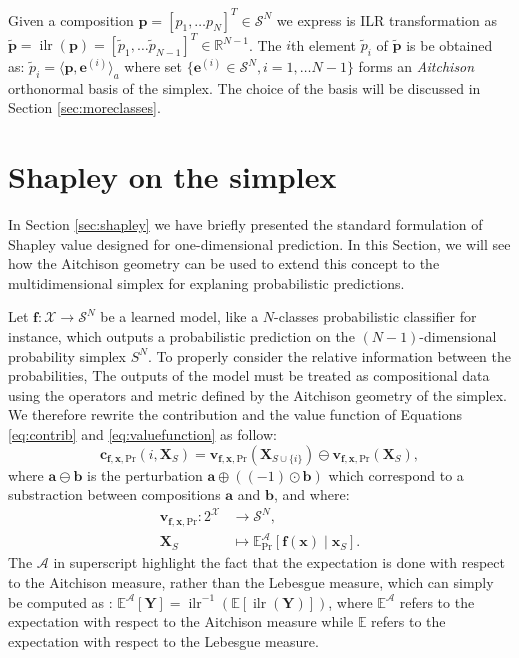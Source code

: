 \documentclass{article}
\theoremstyle{plain}
\theoremstyle{definition}
\theoremstyle{remark}
\DeclareMathOperator{\ilr}{ilr}
\begin{document}
Given a composition $\bm{p} = \left[ p_1,\dots p_N \right]^T \in \mathcal{S}^N$ we express is ILR transformation as $\tilde{\bm{p}} = \ilr \left( \bm{p} \right) = \left[ \tilde{p}_1,\dots \tilde{p}_{N-1} \right]^T \in \mathbb{R}^{N-1}$. The $i$th element $\tilde{p}_i$ of $\tilde{\bm{p}}$ is be obtained as: $\tilde{p}_i = \langle \bm{p}, \bm{e}^{(i)} \rangle_a$ where set $\{\bm{e}^{(i)} \in \mathcal{S}^N, i=1,\dots N-1\}$ forms an \emph{Aitchison} orthonormal basis of the simplex. The choice of the basis will be discussed in Section \ref{sec:moreclasses}.


\section{Shapley on the simplex}

In Section \ref{sec:shapley} we have briefly presented the standard formulation of Shapley value designed for one-dimensional prediction. In this Section, we will see how the Aitchison geometry can be used to extend this concept to the multidimensional simplex for explaning probabilistic predictions.


Let $\bm{f}:\mathcal{X}\to\mathcal{S}^N$ be a learned model, like a $N$-classes probabilistic classifier for instance, which outputs a probabilistic prediction on the $(N-1)$-dimensional probability simplex $S^N$. To properly consider the relative information between the probabilities, The outputs of the model must be treated as compositional data using the operators and metric defined by the Aitchison geometry of the simplex. We therefore rewrite the contribution and the value function of Equations \ref{eq:contrib} and \ref{eq:valuefunction} as follow:
\begin{equation}
  \bm{c}_{\bm{f},\bm{x},\text{Pr}}(i,\bm{X}_S) = \bm{v}_{\bm{f},\bm{x},\text{Pr}}(\bm{X}_{S\cup\{i\}}) \ominus \bm{v}_{\bm{f},\bm{x},\text{Pr}}(\bm{X}_S),
\end{equation}
where $\bm{a}\ominus\bm{b}$ is the perturbation $\bm{a} \oplus \left( (-1)\odot \bm{b}\right)$ which correspond to a substraction between compositions $\bm{a}$ and $\bm{b}$, and where:
\begin{equation}
  \label{eq:valuefunctionsimplex}
  \begin{aligned}
    \bm{v}_{\bm{f},\bm{x},\text{Pr}}: 2^{\mathcal{X}} &\to \mathcal{S}^N,\\
    \bm{X}_S &\mapsto \mathbb{E}^{\mathcal{A}}_\text{Pr}[\bm{f}(\bm{x})\mid \bm{x}_S].
  \end{aligned}
\end{equation}
The $\mathcal{A}$ in superscript highlight the fact that the expectation is done with respect to the Aitchison measure, rather than the Lebesgue measure, which can simply be computed as \cite{pawlowskymodeling}: $\mathbb{E}^{\mathcal{A}}[\bm{Y}] = \ilr^{-1}\left( \mathbb{E} \left[ \ilr\left( \bm{Y} \right) \right] \right)$,
where $\mathbb{E}^{\mathcal{A}}$ refers to the expectation with respect to the Aitchison measure while $\mathbb{E}$ refers to the expectation with respect to the Lebesgue measure.
\end{document}
